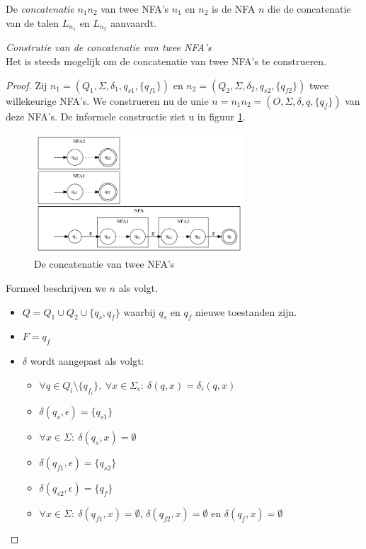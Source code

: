 \documentclass[main.tex]{subfiles}
\begin{document}
\begin{de}
  De \emph{concatenatie} $n_{1}n_{2}$ van twee NFA's $n_{1}$ en $n_{2}$ is de NFA $n$ die de concatenatie van de talen $L_{n_{1}}$ en $L_{n_{2}}$ aanvaardt.
\end{de}

\begin{st}
  \emph{Construtie van de concatenatie van twee NFA's}\\
  Het is steeds mogelijk om de concatenatie van twee NFA's te construeren.

  \begin{proof}
    Zij $n_{1} = (Q_{1},\Sigma,\delta_{1},q_{s1},\{q_{f1}\})$ en $n_{2} = (Q_{2},\Sigma,\delta_{2},q_{s2},\{q_{f2}\})$ twee willekeurige NFA's. We construeren nu de unie $n = n_{1}n_{2} = (O,\Sigma,\delta,q,\{q_{f}\})$ van deze NFA's.
    De informele constructie ziet u in figuur \ref{fig:nfa_concat}.
    \begin{figure}[H]
      \centering
      \includegraphics[width=0.7\textwidth]{assets/nfa_concat.png}      
      \caption{De concatenatie van twee NFA's}
      \label{fig:nfa_concat}
    \end{figure}
    Formeel beschrijven we $n$ als volgt.
    \begin{itemize}
    \item $Q = Q_{1} \cup Q_{2} \cup \{ q_{s}, q_{f} \}$ waarbij $q_{s}$ en $q_{f}$ nieuwe toestanden zijn.
    \item $F = {q_{f}}$
    \item $\delta$ wordt aangepast als volgt:
      \begin{itemize}
      \item $\forall q \in Q_{i}\setminus\{q_{f_{i}}\},\ \forall x \in \Sigma_{\epsilon}:\ \delta(q,x) = \delta_{i}(q,x)$
      \item $\delta(q_{s},\epsilon) = \{q_{s1}\}$
      \item $\forall x \in \Sigma:\ \delta(q_{s},x) = \emptyset$
      \item $\delta(q_{f1},\epsilon) = \{q_{s2}\}$
      \item $\delta(q_{s2},\epsilon) = \{q_{f}\}$
      \item $\forall x \in \Sigma:\ \delta(q_{f1},x) = \emptyset$, $\delta(q_{f2},x) = \emptyset$ en $\delta(q_{f},x) = \emptyset$ 
      \end{itemize}
    \end{itemize}
  \end{proof}
\end{st}
\end{document}
